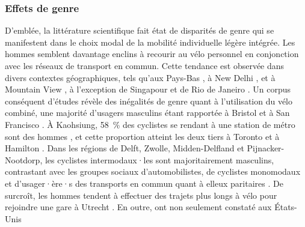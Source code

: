 \begin{refsegment}
\subsubsection*{Effets de genre
    \label{chap2:genre}
    }
    
D'emblée, la littérature scientifique fait état de disparités de \gls{genre} qui se manifestent dans le choix modal de la mobilité individuelle légère intégrée. Les hommes semblent davantage enclins à recourir au vélo personnel en conjonction avec les réseaux de transport en commun. Cette tendance est observée dans divers contextes géographiques, tels qu'aux Pays-Bas \textcolor{blue}{\autocite[278]{debrezion_modelling_2009}}, à New Delhi \textcolor{blue}{\autocite[35]{mohanty_effect_2017}}, et à Mountain View \textcolor{blue}{\autocite[36]{park_finding_2014}}, à l'exception de Singapour \textcolor{blue}{\autocite[45]{meng_influence_2016}} et de Rio de Janeiro \textcolor{blue}{\autocite[62]{souza_modelling_2017}}. Un corpus conséquent d'études révèle des inégalités de genre quant à l'utilisation du vélo combiné, une majorité d'usagers masculins étant rapportée à Bristol \textcolor{blue}{\autocite[194]{sherwin_practices_2011}} et à San Francisco \textcolor{blue}{\autocite[103]{flamm_public_2014}}. À Kaohsiung, 58~\% des cyclistes se rendant à une station de métro sont des hommes \textcolor{blue}{\autocite[1~700]{cheng_evaluating_2012}}, et cette proportion atteint les deux tiers à Toronto et à Hamilton \textcolor{blue}{\autocite[378]{ravensbergen_biking_2018}}. Dans les régions de Delft, Zwolle, Midden-Delfland et Pijnacker-Nootdorp, les cyclistes intermodaux·les sont majoritairement masculins, contrastant avec les groupes sociaux d'automobilistes, de cyclistes monomodaux et d'usager·ère·s des transports en commun quant à elleux paritaires \textcolor{blue}{\autocite[114]{heinen_multimodal_2014}}. De surcroît, les hommes tendent à effectuer des trajets plus longs à vélo pour rejoindre une gare à Utrecht \textcolor{blue}{\autocite[267]{krygsman_multimodal_2004}}. En outre, \textcolor{blue}{\textcite[107]{wang_bicycle-transit_2013}} ont non seulement constaté aux États-Unis 
\end{refsegment}
